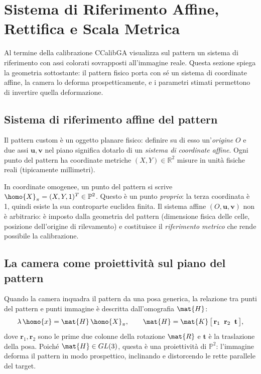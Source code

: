 \section{Sistema di Riferimento Affine, Rettifica e Scala Metrica}
\label{sec:affine_rettifica}

Al termine della calibrazione CCalibGA visualizza sul pattern un sistema
di riferimento con assi colorati sovrapposti all'immagine reale. Questa
sezione spiega la geometria sottostante: il pattern fisico porta con sé
un sistema di coordinate affine, la camera lo deforma prospetticamente,
e i parametri stimati permettono di invertire quella deformazione.

\subsection{Sistema di riferimento affine del pattern}
\label{sub:sistema_affine}

Il pattern custom è un oggetto planare fisico: definire su di esso
un'\emph{origine} \(O\) e due assi \(\mathbf{u}, \mathbf{v}\) nel
piano significa dotarlo di un \emph{sistema di coordinate affine}.
Ogni punto del pattern ha coordinate metriche \((X, Y) \in \mathbb{R}^2\)
misure in unità fisiche reali (tipicamente millimetri).

In coordinate omogenee, un punto del pattern si scrive
\(\homo{X}_{\pi} = (X, Y, 1)^T \in \mathbb{P}^2\).
Questo è un punto \emph{proprio}: la terza coordinata è 1, quindi esiste
la sua controparte euclidea finita. Il sistema affine \((O, \mathbf{u},
\mathbf{v})\) non è arbitrario: è imposto dalla geometria del pattern
(dimensione fisica delle celle, posizione dell'origine di rilevamento)
e costituisce il \emph{riferimento metrico} che rende possibile la calibrazione.

\subsection{La camera come proiettività sul piano del pattern}
\label{sub:camera_proiettivita}

Quando la camera inquadra il pattern da una posa generica,
la relazione tra punti del pattern e punti immagine è descritta
dall'omografia \(\mat{H}\):
\[
  \lambda\,\homo{x} = \mat{H}\,\homo{X}_{\pi},
  \qquad
  \mat{H} = \mat{K}\,\bigl[\,\mathbf{r}_1 \;\; \mathbf{r}_2 \;\; \mathbf{t}\,\bigr],
\]
dove \(\mathbf{r}_1, \mathbf{r}_2\) sono le prime due colonne della
rotazione \(\mat{R}\) e \(\mathbf{t}\) è la traslazione della posa.
Poiché \(\mat{H} \in GL(3)\), questa è una proiettività di
\(\mathbb{P}^2\): l'immagine deforma il pattern in modo prospettico,
inclinando e distorcendo le rette parallele del target.

